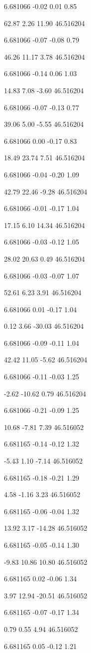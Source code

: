6.681066
-0.02
0.01
0.85

62.87
2.26
11.90
46.516204

6.681066
-0.07
-0.08
0.79

46.26
11.17
3.78
46.516204

6.681066
-0.14
0.06
1.03

14.83
7.08
-3.60
46.516204

6.681066
-0.07
-0.13
0.77

39.06
5.00
-5.55
46.516204

6.681066
0.00
-0.17
0.83

18.49
23.74
7.51
46.516204

6.681066
-0.04
-0.20
1.09

42.79
22.46
-9.28
46.516204

6.681066
-0.01
-0.17
1.04

17.15
6.10
14.34
46.516204

6.681066
-0.03
-0.12
1.05

28.02
20.63
0.49
46.516204

6.681066
-0.03
-0.07
1.07

52.61
6.23
3.91
46.516204

6.681066
0.01
-0.17
1.04

0.12
3.66
-30.03
46.516204

6.681066
-0.09
-0.11
1.04

42.42
11.05
-5.62
46.516204

6.681066
-0.11
-0.03
1.25

-2.62
-10.62
0.79
46.516204

6.681066
-0.21
-0.09
1.25

10.68
-7.81
7.39
46.516052

6.681165
-0.14
-0.12
1.32

-5.43
1.10
-7.14
46.516052

6.681165
-0.18
-0.21
1.29

4.58
-1.16
3.23
46.516052

6.681165
-0.06
-0.04
1.32

13.92
3.17
-14.28
46.516052

6.681165
-0.05
-0.14
1.30

-9.83
10.86
10.80
46.516052

6.681165
0.02
-0.06
1.34

3.97
12.94
-20.51
46.516052

6.681165
-0.07
-0.17
1.34

0.79
0.55
4.94
46.516052

6.681165
0.05
-0.12
1.21

